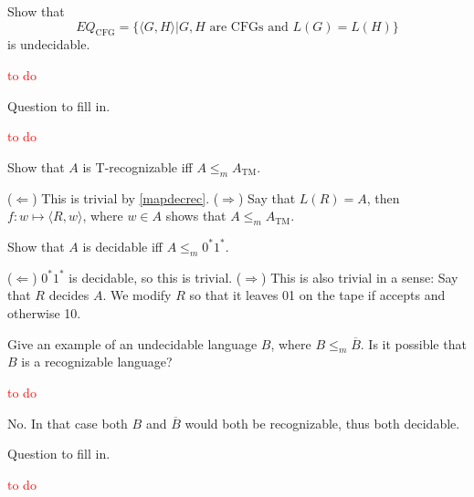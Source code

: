 \begin{exercise}{5.1}
  Show that
  \[
    EQ_{\mathrm{CFG}}=\{\langle G,H\rangle|G,H\text{ are CFGs and }L(G)=L(H)\}
  \]
  is undecidable.
\end{exercise}

\textcolor{red}{to do}

\setcounter{exercise}{20}

\begin{exercise}{5.21}
  Question to fill in.
\end{exercise}

\textcolor{red}{to do}

\begin{exercise}{5.22}
  Show that $A$ is T-recognizable iff $A\leq_mA_{\mathrm{TM}}$.
\end{exercise}

($\Leftarrow$) This is trivial by \ref{mapdecrec}.\newline
($\Rightarrow$) Say that $L(R)=A$, then $f:w\mapsto\langle R,w\rangle$, where $w\in A$ shows that $A\leq_m A_{\mathrm{TM}}$.

\begin{exercise}{5.23}
  Show that $A$ is decidable iff $A\leq_m0^*1^*$.
\end{exercise}

($\Leftarrow$) $0^*1^*$ is decidable, so this is trivial.\newline
($\Rightarrow$) This is also trivial in a sense: Say that $R$ decides $A$. We modify $R$ so that it leaves 01 on the tape if accepts and otherwise 10.

\setcounter{exercise}{24}

\begin{exercise}{5.25}
  Give an example of an undecidable language $B$, where $B\leq_m \overline{B}$. Is it possible that $B$ is a recognizable language?
\end{exercise}

\textcolor{red}{to do}

No. In that case both $B$ and $\overline{B}$ would both be recognizable, thus both decidable.

\begin{exercise}{5.26}
  Question to fill in.
\end{exercise}

\textcolor{red}{to do}
